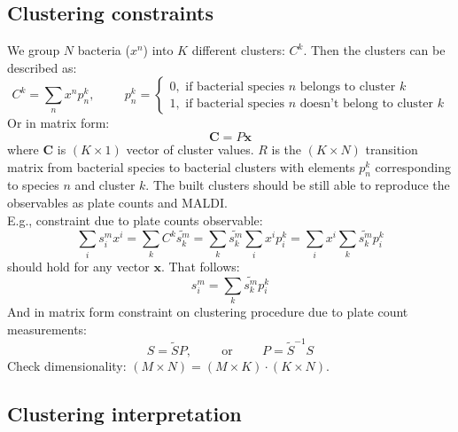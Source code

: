 \documentclass[10pt,A4paper]{article}
\begin{document}
\subsection{Clustering constraints}
We group $N$ bacteria ($x^n$) into $K$ different clusters: $C^k$.
Then the clusters can be described as:
\begin{equation}
    C^k = \sum_n x^n p_n^k, \hspace{1cm} p_n^k = \begin{cases}
        0, \text{ if bacterial species $n$ belongs to cluster } k \\
        1, \text{ if bacterial species $n$ doesn't belong to cluster } k
    \end{cases}
\end{equation}
Or in matrix form: 
\begin{equation}
    \mathbf{C} = P \mathbf{x}
\end{equation}
where $\mathbf{C}$ is $(K \times 1)$ vector of cluster values.
$R$ is the $(K \times N)$ transition matrix from bacterial species to bacterial clusters with elements $p_n^k$ corresponding to species $n$ and cluster $k$.
The built clusters should be still able to reproduce the observables as plate counts and MALDI.\\
E.g., constraint due to plate counts observable:
\begin{equation}
    \sum_i s_i^m x^i = \sum_k C^k \tilde{s^m_k} = \sum_k  \tilde{s^m_k} \sum_i x^i p_i^k = \sum_i x^i \sum_k \tilde{s^m_k} p_i^k
\end{equation}
should hold for any vector $\mathbf{x}$.
That follows:
\begin{equation}
    \boxed{s_i^m = \sum_k \tilde{s^m_k} p_i^k}
\end{equation}
And in matrix form constraint on clustering procedure due to plate count measurements:
\begin{equation}
    \boxed{S = \tilde{S} P}, \hspace{1cm} \text{or} \hspace{1cm}  \boxed{P = \tilde{S}^{-1} S}
\end{equation}
Check dimensionality: $(M \times N) = (M \times K) \cdot (K \times N)$.

\subsection{Clustering interpretation}
\end{document}
